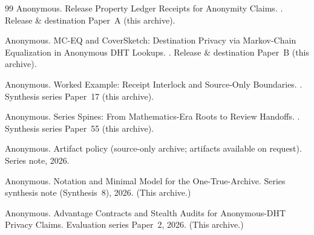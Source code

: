 \documentclass[11pt]{article}
\begin{document}
\begin{thebibliography}{99}
Anonymous.
\newblock Release Property Ledger Receipts for Anonymity Claims.
.
\newblock Release \& destination Paper~A (this archive).

Anonymous.
\newblock MC-EQ and CoverSketch: Destination Privacy via Markov-Chain Equalization in Anonymous DHT Lookups.
.
\newblock Release \& destination Paper~B (this archive).

Anonymous.
\newblock Worked Example: Receipt Interlock and Source-Only Boundaries.
.
\newblock Synthesis series Paper~17 (this archive).

Anonymous.
\newblock Series Spines: From Mathematics-Era Roots to Review Handoffs.
.
\newblock Synthesis series Paper~55 (this archive).

Anonymous.
\newblock Artifact policy (source-only archive; artifacts available on request).
\newblock Series note, 2026.

Anonymous.
\newblock Notation and Minimal Model for the One-True-Archive.
\newblock Series synthesis note (Synthesis~8), 2026. (This archive.)



Anonymous.
\newblock Advantage Contracts and Stealth Audits for Anonymous-DHT Privacy Claims.
\newblock Evaluation series Paper~2, 2026. (This archive.)

\end{thebibliography}
\end{document}
